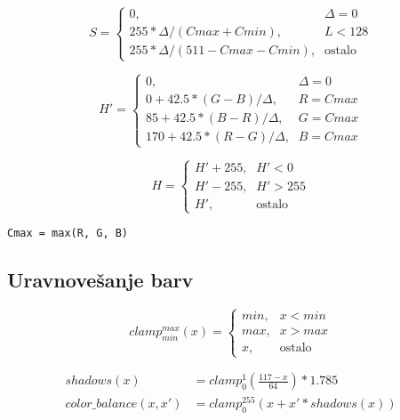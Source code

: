 \begin{equation}
S =
\begin{cases}
    0 \text{,}& \Delta = 0 \\
    255 * \Delta / (Cmax + Cmin) \text{,}& L < 128 \\
    255 * \Delta / (511 - Cmax - Cmin) \text{,}& \text{ostalo}
\end{cases}
\end{equation}

\begin{equation}
H' =
\begin{cases}
    0 \text{,}& \Delta = 0 \\
    0 + 42.5 * (G - B) / \Delta \text{,}& R = Cmax \\
    85 + 42.5 * (B - R) / \Delta \text{,}& G = Cmax \\
    170 + 42.5 * (R - G) / \Delta \text{,}& B = Cmax
\end{cases}
\end{equation}

\begin{equation}
H =
\begin{cases}
    H' + 255 \text{,}& H' < 0 \\
    H' - 255 \text{,}& H' > 255 \\
    H' \text{,}& \text{ostalo}
\end{cases}
\end{equation}

\begin{lstlisting}[caption=algoritem]
Cmax = max(R, G, B)

\end{lstlisting}

\subsection{Uravnovešanje barv}

\begin{equation}
clamp_{min}^{max}(x) =
\begin{cases}
    min \text{,}& x < min \\
    max \text{,}& x > max \\
    x \text{,}& \text{ostalo}
\end{cases}
\end{equation}

\begin{align}
shadows(x) &= clamp_{0}^{1}(\frac{117 - x}{64}) * 1.785 \\
color\_balance(x, x') &= clamp_{0}^{255}(x + x' * shadows(x)) \label{eq:color_balance}
\end{align}

